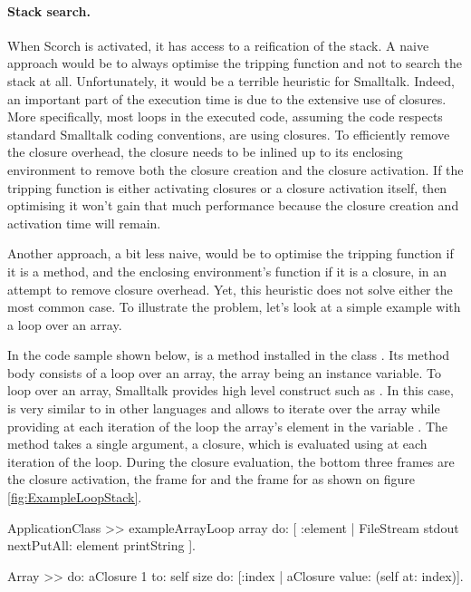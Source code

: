 \documentclass[a4paper,12pt,twoside]{../includes/ThesisStyle}
\begin{document}
\paragraph{Stack search.}
\label{ss:stackSearch}

When Scorch is activated, it has access to a reification of the stack. A naive approach would be to always optimise the tripping function and not to search the stack at all. Unfortunately, it would be a terrible heuristic for Smalltalk. Indeed, an important part of the execution time is due to the extensive use of closures. More specifically, most loops in the executed code, assuming the code respects standard Smalltalk coding conventions, are using closures. To efficiently remove the closure overhead, the closure needs to be inlined up to its enclosing environment to remove both the closure creation and the closure activation. If the tripping function is either activating closures or a closure activation itself, then optimising it won't gain that much performance because the closure creation and activation time will remain.

Another approach, a bit less naive, would be to optimise the tripping function if it is a method, and the enclosing environment's function if it is a closure, in an attempt to remove closure overhead. Yet, this heuristic does not solve either the most common case. To illustrate the problem, let's look at a simple example with a loop over an array.

In the code sample shown below,  is a method installed in the class . Its method body consists of a loop over an array, the array being an instance variable. To loop over an array, Smalltalk provides high level construct such as . In this case,  is very similar to  in other languages and allows to iterate over the array while providing at each iteration of the loop the array's element in the variable . The  method takes a single argument, a closure, which is evaluated using  at each iteration of the loop. During the closure evaluation, the bottom three frames are the closure activation, the frame for  and the frame for  as shown on figure \ref{fig:ExampleLoopStack}.

\begin{code}
	ApplicationClass >> exampleArrayLoop
	    array do: [ :element | FileStream stdout nextPutAll: element printString ].
		
	Array >> do: aClosure
	    1 to: self size do: [:index | aClosure value: (self at: index)].
\end{code}
\end{document}
